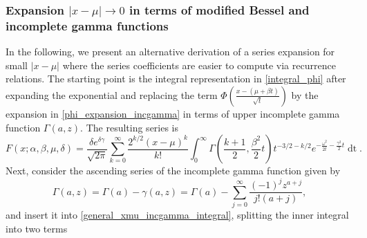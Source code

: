 \documentclass[10pt,a4paper,oneside]{article}
\numberwithin{equation}{section}
\begin{document}

\subsubsection{Expansion $|x-\mu| \to 0$ in terms of modified Bessel and incomplete gamma functions}
In the following, we present an alternative derivation of a series expansion for small $|x-\mu|$ where the series coefficients are easier to compute via recurrence relations. The starting point is the integral representation in \eqref{integral_phi} after expanding the exponential
and replacing the term $\Phi\left(\frac{x - (\mu +\beta t)}{\sqrt{t}}\right)$ by the expansion in \eqref{phi_expansion_incgamma} in terms of upper incomplete gamma function $\Gamma(a, z)$. The resulting series is
\begin{equation}\label{general_xmu_incgamma_integral}
F(x;\alpha, \beta, \mu, \delta) = \frac{\delta e^{\delta \gamma}}{\sqrt{2\pi}} \sum_{k=0}^{\infty}\frac{2^{k/2}(x-\mu)^k}{k!}\int_0^{\infty}\Gamma\left(\frac{k+1}{2}, \frac{\beta^2}{2}t\right) t^{-3/2-k/2} e^{-\frac{\omega^2}{2t} - \frac{\gamma^2}{2}t} \mathop{dt}.
\end{equation}
Next, consider the ascending series of the incomplete gamma function given by \cite[\S 8.7]{NIST:DLMF}
\begin{equation}
\Gamma(a, z) = \Gamma(a) - \gamma(a, z) = \Gamma(a) - \sum_{j=0}^{\infty} \frac{(-1)^j z^{a+j}}{j! (a+ j)},
\end{equation}
and insert it into \eqref{general_xmu_incgamma_integral}, splitting the inner integral into two terms
\end{document}
